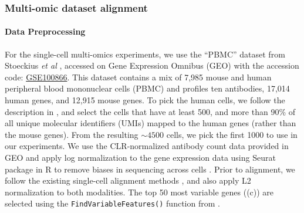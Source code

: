 \subsubsection{Multi-omic dataset alignment}\label{multiOmics_exp_SI}

\paragraph{Data Preprocessing} \label{CITEseq_exp_appendix}
For the single-cell multi-omics experiments, we use the ``PBMC'' dataset from Stoeckius
\textit{et al} \citep{CITEseq}, accessed on Gene Expression Omnibus (GEO) with the
accession code: \href{https://www.ncbi.nlm.nih.gov/geo/query/acc.cgi?acc=GSE100866}{GSE100866}.
This dataset contains a mix of 7,985 mouse and human peripheral blood mononuclear cells (PBMC)
and profiles ten antibodies, 17,014 human genes, and 12,915 mouse genes. To pick the human cells,
we follow the description in \citep{CITEseq}, and select the cells that have at least 500,
and more than 90\% of all unique molecular identifiers (UMIs) mapped to the human genes
(rather than the mouse genes). From the resulting $\sim 4500$ cells, we pick the first 1000
to use in our experiments. We use the CLR-normalized antibody count data provided in GEO
and apply log normalization to the gene expression data using Seurat package in R to
remove biases in sequencing across cells \citep{Seurat}. Prior to alignment,
we follow the existing single-cell alignment methods \citep{Demetci22, Demetci22-2,Liu2019,singh20},
and also apply L2 normalization to both modalities. The top 50 most variable genes
((c)) are selected using the \texttt{FindVariableFeatures()}
function from \citep{Seurat}.

